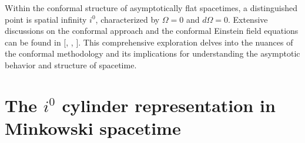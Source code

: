 Within the conformal structure of asymptotically flat spacetimes, a distinguished point is spatial infinity $i^0$, characterized by $\Omega = 0$ and $d\Omega = 0$. Extensive discussions on the conformal approach and the conformal Einstein field equations can be found in [\cite{Val16}, \cite{Fra04}, \cite{Fri02}]. This comprehensive exploration delves into the nuances of the conformal methodology and its implications for understanding the asymptotic behavior and structure of spacetime.

\section{The $i^0$ cylinder representation in Minkowski  spacetime}
\label{the $i^0$ cylinder}

